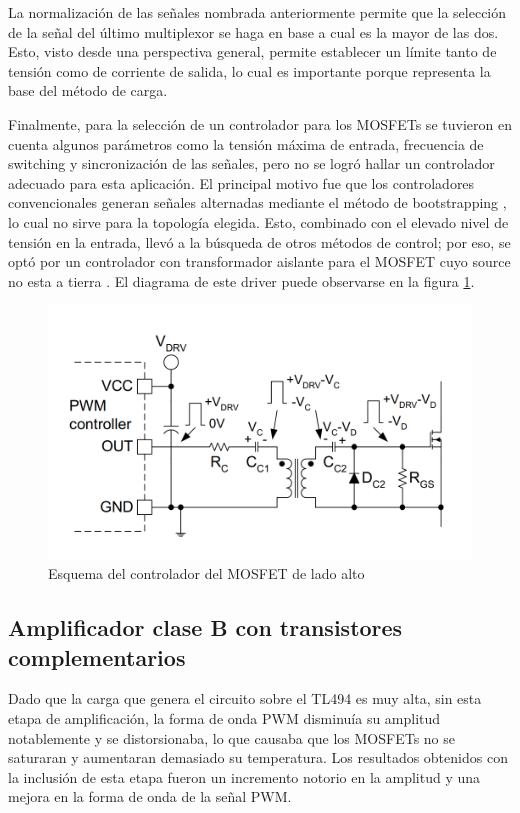 La normalización de las señales nombrada anteriormente permite que la selección de la señal del último multiplexor
se haga en base a cual es la mayor de las dos. Esto, visto desde una perspectiva general, permite establecer un límite
tanto de tensión como de corriente de salida, lo cual es importante porque representa la base del método de carga.

Finalmente, para la selección de un controlador para los MOSFETs se tuvieron en cuenta algunos parámetros como
la tensión máxima de entrada, frecuencia de switching y sincronización de las señales,
pero no se logró hallar un controlador adecuado para esta aplicación.
El principal motivo fue que los controladores convencionales generan señales alternadas mediante el método de bootstrapping \cite{hart},
lo cual no sirve para la topología elegida. Esto, combinado con el elevado nivel de tensión en la entrada,
llevó a la búsqueda de otros métodos de control; por eso, se optó por un controlador con transformador aislante para el MOSFET cuyo source no esta a tierra \cite{gatedrivers}. El diagrama de este driver puede observarse en la figura \ref{fig:driver}.

\begin{figure}
    \centering
    \includegraphics[width=\textwidth]{images/esquema_driver.png}
    \caption{Esquema del controlador del MOSFET de lado alto}
    \label{fig:driver}
\end{figure}

\subsection{Amplificador clase B con transistores complementarios}

Dado que la carga que genera el circuito sobre el TL494 es muy alta, sin esta etapa de amplificación, la forma de onda PWM disminuía su amplitud notablemente y se distorsionaba, lo que causaba que los MOSFETs no se saturaran y aumentaran demasiado su temperatura.
Los resultados obtenidos con la inclusión de esta etapa fueron un incremento notorio en la amplitud y una mejora en la forma de onda de la señal PWM.

